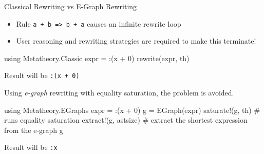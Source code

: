\documentclass[8pt]{beamer}  %
\begin{document}

\begin{frame}[fragile]{Classical Rewriting vs E-Graph Rewriting}   %

\begin{itemize}
    \item Rule \texttt{a + b => b + a} causes an infinite rewrite loop
    \item User reasoning and rewriting strategies are required to make this terminate!
\end{itemize}

\begin{jllisting}
using Metatheory.Classic
expr = :(x + 0)
rewrite(expr, th)
\end{jllisting}

Result will be \texttt{:(x + 0)}

Using \textit{e-graph} rewriting with equality saturation, the problem is avoided.

\begin{jllisting}
using Metatheory.EGraphs
expr = :(x + 0)
g = EGraph(expr)
saturate!(g, th) # runs equality saturation
extract!(g, astsize) # extract the shortest expression from the e-graph g
\end{jllisting}

Result will be \texttt{:x}


\end{frame}











\end{document}
